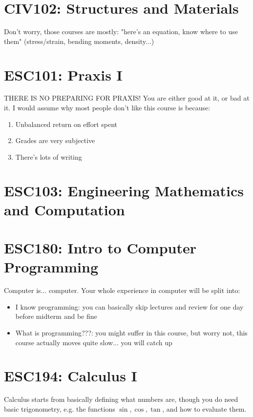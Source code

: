 \section{CIV102: Structures and Materials}

Don't worry, those courses are mostly: "here's an equation, know where to use them" (stress/strain, bending moments, density...)

\section{ESC101: Praxis I}
THERE IS NO PREPARING FOR PRAXIS! You are either good at it, or bad at it. I would assume why most people don't like this course is because:

\begin{enumerate}
    \item Unbalanced return on effort spent
    \item Grades are very subjective
    \item There's lots of writing
\end{enumerate}

\section{ESC103: Engineering Mathematics and Computation}

\section{ESC180: Intro to Computer Programming}

Computer is... computer. Your whole experience in computer will be split into:
\begin{itemize}
    \item I know programming: you can basically skip lectures and review for one day before midterm and be fine
    \item What is programming???: you might suffer in this course, but worry not, this course actually moves quite slow... you will catch up
\end{itemize}

\section{ESC194: Calculus I}

Calculus starts from basically defining what numbers are, though you do need basic trigonometry, e.g. the functions $\sin, \cos, \tan$, and how to evaluate them.


